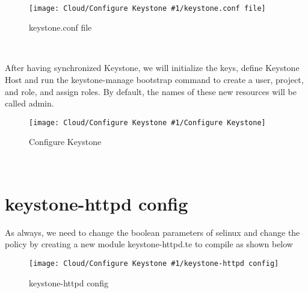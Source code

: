 \begin{spacing}{1.2}
\\
\begin{figure}[!htb] 
\begin{center} 
\texttt{[image: Cloud/Configure Keystone \#1/keystone.conf file]} 
\end{center} 
\caption{keystone.conf file} 
\end{figure}  \FloatBarrier
\\
\par After having synchronized Keystone, we will initialize the keys, define Keystone Host and
run the keystone-manage bootstrap command to create a user, project, and role, and
assign roles. By default, the names of these new resources will be called admin. 
\\
\begin{figure}[!htb] 
\begin{center} 
\texttt{[image: Cloud/Configure Keystone \#1/Configure Keystone]} 
\end{center} 
\caption{Configure Keystone} 
\end{figure}  \FloatBarrier
\\
\section{keystone-httpd config}
\par 
As always, we need to change the boolean parameters of selinux and change the policy by creating a new module keystone-httpd.te to compile as shown below
\\
\begin{figure}[!htb] 
\begin{center} 
\texttt{[image: Cloud/Configure Keystone \#1/keystone-httpd config]} 
\end{center} 
\caption{keystone-httpd config} 
\end{figure}  \FloatBarrier
\\

\end{spacing}
